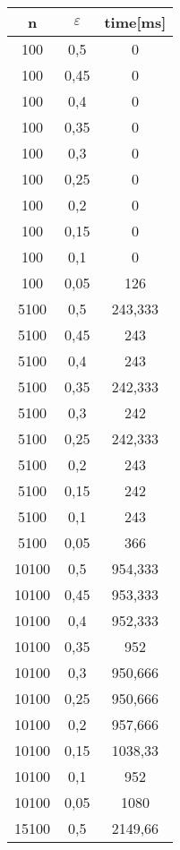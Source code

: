 \documentclass[wide,a4paper,titlepage,12pt] {article}
\begin{document}
\paragraph{}

\begin{center}
  \begin{longtable}{|c|c|c|}
    \hline
    n & $\varepsilon$ & time[ms]\\ \hline
    100 & 0,5&  0 \\ \hline
    100 & 0,45 & 0\\ \hline
    100 & 0,4 & 0\\ \hline
    100 & 0,35 & 0\\ \hline
    100 & 0,3 & 0\\ \hline
    100 & 0,25 & 0\\ \hline
    100 & 0,2 & 0\\ \hline
    100 & 0,15 & 0\\ \hline
    100 & 0,1 & 0\\ \hline
    100 & 0,05 & 126\\ \hline
    5100 & 0,5 & 243,333\\ \hline
    5100 & 0,45 & 243\\ \hline
    5100 & 0,4 & 243\\ \hline
    5100 & 0,35 & 242,333\\ \hline
    5100 & 0,3 & 242\\ \hline
    5100 & 0,25 & 242,333\\ \hline
    5100 & 0,2 & 243\\ \hline
    5100 & 0,15 & 242\\ \hline
    5100 & 0,1 & 243\\ \hline
    5100 & 0,05 & 366\\ \hline
    10100 & 0,5 & 954,333\\ \hline
    10100 & 0,45 & 953,333\\ \hline
    10100 & 0,4 & 952,333\\ \hline
    10100 & 0,35 & 952\\ \hline
    10100 & 0,3 & 950,666\\ \hline
    10100 & 0,25 & 950,666\\ \hline
    10100 & 0,2 & 957,666\\ \hline
    10100 & 0,15 & 1038,33\\ \hline
    10100 & 0,1 & 952\\ \hline
    10100 & 0,05 & 1080\\ \hline
    15100 & 0,5 & 2149,66\\ \hline

\end{longtable}
\end{center}
\end{document}
